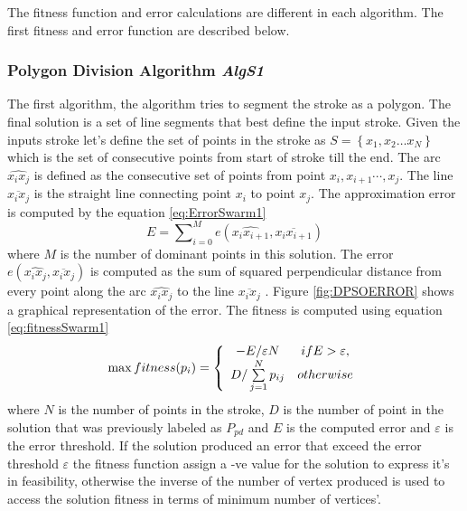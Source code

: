 The fitness function and error calculations are different in each algorithm. The first fitness and error function are described below. 


\subsubsection{Polygon Division Algorithm \textsl{AlgS1}}
\label{sec:PolygonDivisionAlgorithm}
The first algorithm, the algorithm tries to segment the stroke as a polygon. The final solution is a set of line segments that best define the input stroke. Given the inputs stroke let's define the set of points in the stroke as  $S = \left\{ {x_1 ,x_2  \ldots x_N } \right\}$ which is the set of consecutive points from start of stroke till the end. The arc $\widehat{x_ix_j}$ is defined as the consecutive set of points from point $x_i,x_{i+1} \cdots,x_j$. The line
$\overline{x_i x_j} $ is the straight line connecting point $x_i$ to point $x_j$. The approximation error is computed by the equation \ref{eq:ErrorSwarm1} 
\begin{equation}
E=\sum\nolimits_{i = 0}^M e ( \widehat{x_ix_{i+1}},\overline{x_i x_{i+1}})
\label{eq:ErrorSwarm1}
\end{equation}
 where $M$ is the number of dominant points in this solution.  The error $ e ( \widehat{x_ix_j},\overline{x_i x_j})$ is computed as the sum of squared perpendicular distance from every point along the arc $\widehat{x_ix_j}$ to the line $\overline{x_i x_j}$ \cite{PolygonApproximationPSO}. Figure \ref{fig:DPSOERROR} shows a graphical representation of the error. The fitness is computed using equation \ref{eq:fitnessSwarm1} 
\begin{equation}
\max fitness(p_i ) = \left\{ {\begin{array}{*{20}c}
   { - E/\varepsilon N} & {ifE > \varepsilon ,}  \\
   {D/\sum\limits_{j = 1}^N {p_{ij} } } & {otherwise}  \\
\end{array}} \right.
\label{eq:fitnessSwarm1}
\end{equation}%
where $N$ is the number of points in the stroke, $D$ is the number of point in the solution that was previously labeled as $P_{pd}$  and $E$ is the computed error and $\varepsilon$ is the error threshold.  If the solution produced an error that exceed the error threshold $\varepsilon$ the fitness function assign a -ve value for the solution to express it's in feasibility, otherwise the inverse of the number of vertex produced is used to access the solution fitness in terms of minimum number of vertices'.  

